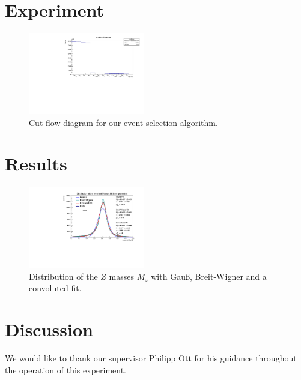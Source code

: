 \documentclass[twocolumn,
			   showpacs,%
               nofootinbib,
               aps,%
               prd,
               notitlepage,
               showkeys,
               10pt]{revtex4-1}
\begin{document}
\section{Experiment}

\begin{figure}[H]
\centering
\includegraphics[width = 0.45\textwidth]
{figures/plots/CutFlow}
\caption{Cut flow diagram for our event selection algorithm.}	
\end{figure}




\blindtext




\section{Results}
\blindtext



\begin{figure}[H]
	\centering
	\includegraphics[width = 0.45\textwidth]{figures/plots/ZMassFitted}
	\caption{Distribution of the $Z$ masses $M_z$ with Gau\ss, Breit-Wigner and a convoluted fit.}
\end{figure}




\section{Discussion}

\Blindtext


\begin{acknowledgments}

We would like to thank our supervisor Philipp Ott for his guidance throughout the operation of this experiment.

\end{acknowledgments}



\nocite{*}
\end{document}
